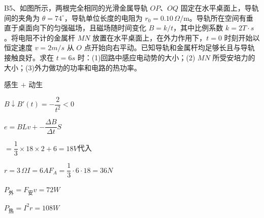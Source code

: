 \begin{problem}
B5、如图所示，两根完全相同的光滑金属导轨 $OP$、$OQ$ 固定在水平桌面上，导轨间的夹角为 $\theta=74^\circ$，导轨单位长度的电阻为 $r_0=0.10\,\Omega/\mathrm{m}$。导轨所在空间有垂直于桌面向下的匀强磁场，且磁场随时间变化 $B=k/t$，其中比例系数 $k=2\unit{T\cdot s}$。将电阻不计的金属杆 $MN$ 放置在水平桌面上，在外力作用下，$t=0$ 时刻开始以恒定速度 $v=2\unit{m/s}$ 从 $O$ 点开始向右平动。已知导轨和金属杆均足够长且与导轨接触良好。求在 $t=6\unit{s}$ 时：(1)回路中感应电动势的大小；(2) $MN$ 所受安培力的大小；(3)外力做功的功率和电路的热功率。
\begin{solution}
感生 $+$ 动生

$B\downarrow$\qquad $B'(t)=-\dfrac{2}{t^2}<0$

$e=BLv+{-}\dfrac{\Delta B}{\Delta t}S$

$=\dfrac{1}{3}\times18\times2+6=18\unit{V}$\qquad 代入

$r=3\,\Omega$\quad $I=6\unit{A}$\quad $F_A=\dfrac{1}{3}\cdot6\cdot18=36\unit{N}$

$P_{\text{外}}=F_{\text{安}}v=72\unit{W}$

$P_{\text{热}}=I^2r=108\unit{W}$
\end{solution}
\end{problem}
